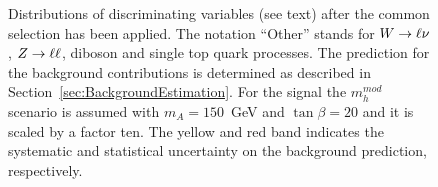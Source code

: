 \begin{figure}[p]
\begin{center}
{            %
	    \label{Ht}	
     }	

    \end{center}
    \caption{Distributions of discriminating variables (see text) after the common selection has been applied.
 	The notation ``Other'' stands 	for $W\rightarrow \ell \nu$, $Z\rightarrow \ell \ell$, diboson and single top quark processes.
	The prediction for the background contributions is determined as described in 	Section~\ref{sec:BackgroundEstimation}.
	For the signal the $m_h^{mod}$ scenario is assumed with  $m_A=150$~GeV and $\tan\beta=20$ and it is scaled
	by a factor ten. The yellow and red band indicates the systematic and statistical uncertainty on the background prediction, respectively.}
   \label{fig:selections}
\end{figure}

